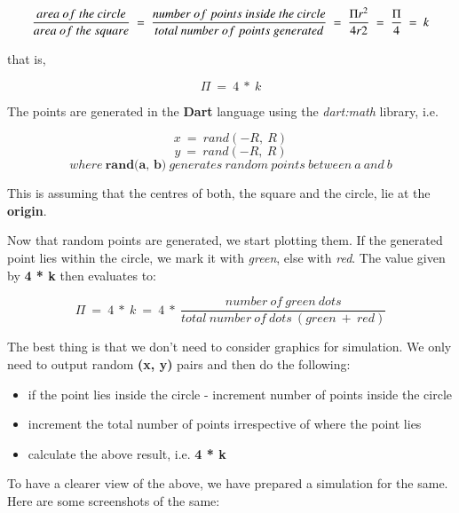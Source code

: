 \documentclass{resonance}
\begin{document}
$$\frac{area\ of\ the\ circle}{area\ of\ the\ square}\ =\ \frac{number\ of\ points\ inside\ the\ circle}{total\ number\ of\ points\ generated}\ =\ \frac{\Pi r\textsuperscript{2}}{4r2}\ =\ \frac{\Pi}{4}\ =\ k$$

that is,

$$\Pi\ =\ 4\ *\ k$$

The points are generated in the \textbf{Dart} language using the \textit{dart:math} library, i.e.

$$x\ =\ rand(-R,\ R)$$
$$y\ =\ rand(-R,\ R)$$
$$where\ \textbf{rand(a,\ b)}\ generates\ random\ points\ between\ a\ and\ b$$

This is assuming that the centres of both, the square and the circle, lie at the \textbf{origin}.


Now that random points are generated, we start plotting them. If the generated point lies within the circle, we mark it with \textit{green}, else with \textit{red}. The value given by \textbf{4 * k} then evaluates to:

$$\Pi\ =\ 4\ *\ k\ =\ 4\ *\ \frac{number\ of\ green\ dots}{total\ number\ of\ dots\ (green\ +\ red)}$$

The best thing is that we don’t need to consider graphics for simulation. We only need to output random \textbf{(x, y)} pairs and then do the following:

\begin{itemize}
    \item if the point lies inside the circle - increment number of points inside the circle
    \item increment the total number of points irrespective of where the point lies
    \item calculate the above result, i.e. \textbf{4 * k}
\end{itemize}

To have a clearer view of the above, we have prepared a simulation for the same. Here are some screenshots of the same:
\end{document}
